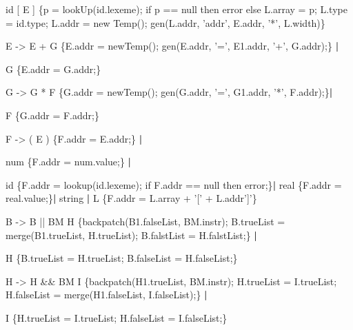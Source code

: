 \documentclass{ML}
\begin{document}
\begin{enumerate}
{    \hspace{1cm}id [ E ] {\color{red}\{p = lookUp(id.lexeme); if p == null then error else L.array = p; L.type = id.type; L.addr = new Temp(); gen(L.addr, 'addr', E.addr, '*', L.width)\}}
    \vspace{0.5cm}
    
    \item E -> E + G {\color{red}\{E.addr = newTemp(); gen(E.addr, '=', E1.addr, '+', G.addr);\}} \textbf{|}
    
    \hspace{1cm}G {\color{red}\{E.addr = G.addr;\}}
    
    \vspace{0.5cm}
    \item G -> G * F {\color{red}\{G.addr = newTemp(); gen(G.addr, '=', G1.addr, '*', F.addr);\}}\textbf{|} 
    
    \hspace{1cm}F {\color{red}\{G.addr = F.addr;\}}
    \vspace{0.5cm}
    
    \item F -> ( E ) {\color{red}\{F.addr = E.addr;\}} \textbf{|} 
    
    \hspace{1cm}num {\color{red}\{F.addr = num.value;\}} \textbf{|}
    
    \hspace{1cm}id {\color{red}\{F.addr = lookup(id.lexeme); if F.addr == null then error;\}}\textbf{|} real {\color{red}\{F.addr = real.value;\}}\textbf{|} string \textbf{|} L {\color{red}\{F.addr = L.array + '[' + L.addr']'\}}
    \vspace{0.5cm}
    
    \item B -> B || BM H {\color{red}\{backpatch(B1.falseList, BM.instr); B.trueList = merge(B1.trueList, H.trueList); B.falstList = H.falstList;\}} \textbf{|}
    
    \hspace{1cm}H {\color{red}\{B.trueList = H.trueList; B.falseList = H.falseList;\}}
    \vspace{0.5cm}
    
    \item H -> H \&\& BM I {\color{red}\{backpatch(H1.trueList, BM.instr); H.trueList = I.trueList; H.falseList = merge(H1.falseList, I.falseList);\}} \textbf{|}
    
    \hspace{1cm}I {\color{red}\{H.trueList = I.trueList; H.falseList = I.falseList;\}}
    \vspace{0.5cm}
    
}
\end{enumerate}
\end{document}
